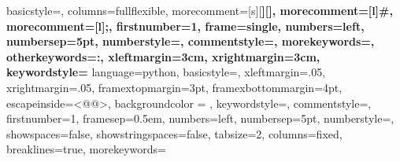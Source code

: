 		{
			basicstyle=\ttfamily\small,
			columns=fullflexible,
			morecomment=[s][\color{Orchid}\bfseries]{[}{]},
			morecomment=[l]{\#},
			morecomment=[l]{;},
			firstnumber=1,                	%
			frame=single,	                	%
			numbers=left,                   %
			numbersep=5pt,                  %
			numberstyle=\tiny\color{gray},	%
			commentstyle=\color{gray}\ttfamily,
			morekeywords={},
			otherkeywords={:},
			xleftmargin=3cm,
			xrightmargin=3cm,
			keywordstyle={\color{blue}\bfseries}
		}
	{
		language=python,
		basicstyle=\ttm, %
		xleftmargin=.05\textwidth,
		xrightmargin=.05\textwidth,
		framextopmargin=3pt,
		framexbottommargin=4pt, 
		escapeinside={<@}{@>},
		backgroundcolor = \color{light-gray}, %
		keywordstyle=\color{vbablue},   %
		commentstyle=\color{gray}\ttfamily,  %
		firstnumber=1,                	%
		framesep=0.5em,
		numbers=left,                   %
		numbersep=5pt,                  %
		numberstyle=\tiny\color{gray},	%
		showspaces=false,               %
		showstringspaces=false,         %
		tabsize=2,		                %
		columns=fixed,					%
		breaklines=true,				%
		morekeywords={}%
	}